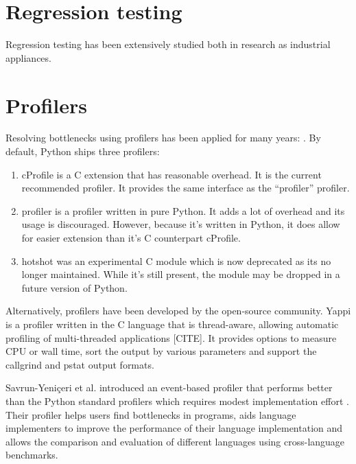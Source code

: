 \section{Regression testing}
Regression testing has been extensively studied both in research as industrial appliances.

\section{Profilers}
Resolving bottlenecks using profilers has been applied for many years: \cite{pesterev2010locating, gorelick2014high, fan2013performance}.
By default, Python ships three profilers:

\begin{enumerate}
	\item cProfile is a C extension that has reasonable overhead. It is the current recommended profiler. It provides the same interface as the ``profiler'' profiler.
	\item profiler is a profiler written in pure Python. It adds a lot of overhead and its usage is discouraged. However, because it's written in Python, it does allow for easier extension than it's C counterpart cProfile.
	\item hotshot was an experimental C module which is now deprecated as its no longer maintained. While it's still present, the module may be dropped in a future version of Python.
\end{enumerate}

Alternatively, profilers have been developed by the open-source community.
Yappi is a profiler written in the C language that is thread-aware, allowing automatic profiling of multi-threaded applications [CITE].
It provides options to measure CPU or wall time, sort the output by various parameters and support the callgrind and pstat output formats.

Savrun-Yeni{\c{c}}eri et al. introduced an event-based profiler that performs better than the Python standard profilers which requires modest implementation effort \cite{savrun2015efficient}.
Their profiler helps users find bottlenecks in programs, aids language implementers to improve the performance of their language implementation and allows the comparison and evaluation of different languages using cross-language benchmarks.\\
